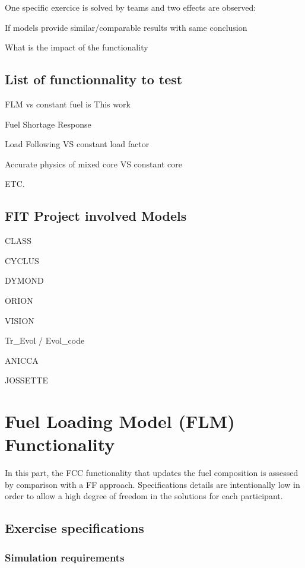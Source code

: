 \documentclass[review]{elsarticle}
\begin{document}
One specific exercice is solved by teams and two effects are observed:

If models provide similar/comparable results with same conclusion

What is the impact of the functionality 

\subsection{List of functionnality to test}

FLM vs constant fuel is This work

Fuel Shortage Response

Load Following VS constant load factor

Accurate physics of mixed core VS constant core

ETC.

\subsection{FIT Project involved Models}


CLASS

CYCLUS

DYMOND

ORION

VISION

Tr\_Evol / Evol\_code

ANICCA

JOSSETTE

\section{Fuel Loading Model (FLM) Functionality}

In this part, the FCC functionality that updates the fuel composition is assessed by comparison with a FF approach. Specifications details are intentionally low in order to allow a high degree of freedom in the solutions for each participant. 

\subsection{Exercise specifications}

\subsubsection{Simulation requirements}
\end{document}
